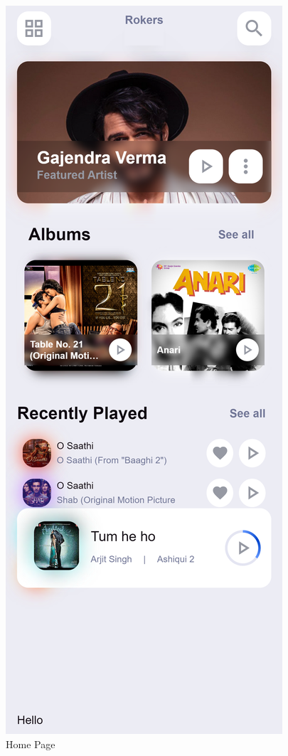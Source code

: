 \begin{figure}[H]
  \caption{Home Page}
  \includegraphics[scale=.2]{./screenshot.png}

\end{figure}
